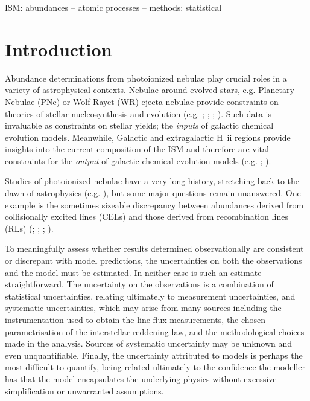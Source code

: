 \documentclass[useAMS,usenatbib]{mn2e}
\begin{document}
\begin{keywords}
ISM: abundances -- atomic processes -- methods: statistical
\end{keywords}

\section{Introduction}

Abundance determinations from photoionized nebulae play crucial roles in a variety of astrophysical contexts. Nebulae around evolved stars, e.g. Planetary Nebulae (PNe) or Wolf-Rayet (WR) ejecta nebulae provide constraints on theories of stellar nucleosynthesis and evolution (e.g. \citealt{2009ApJ...690.1130K};  \citealt{2011arXiv1110.1186M}; \citealt{1992A&A...264..105M}; \citealt{2011MNRAS.418.2532S}). Such data is invaluable as constraints on stellar yields; the \textit{inputs} of galactic chemical evolution models. Meanwhile, Galactic and extragalactic H~{\sc ii} regions provide insights into the current composition of the ISM and therefore are vital constraints for the \textit{output} of galactic chemical evolution models (e.g. \citealt{1997nceg.book.....P}; \citealt{2003ceg..book.....M}).

Studies of photoionized nebulae have a very long history, stretching back to the dawn of astrophysics (e.g. \citealt{1864RSPT..154..437H}), but some major questions remain unanswered.  One example is the sometimes sizeable discrepancy between abundances derived from collisionally excited lines (CELs) and those derived from recombination lines (RLs) (\citealt{2005MNRAS.362..424W}; \citealt{2006MNRAS.368.1959L}; \citealt{2007ApJ...670..457G}; \citealt{2008MNRAS.386...22T}).

To meaningfully assess whether results determined observationally are consistent or discrepant with model predictions, the uncertainties on both the observations and the model must be estimated.  In neither case is such an estimate straightforward.  The uncertainty on the observations is a combination of statistical uncertainties, relating ultimately to measurement uncertainties, and systematic uncertainties, which may arise from many sources including the instrumentation used to obtain the line flux measurements, the chosen parametrisation of the interstellar reddening law, and the methodological choices made in the analysis.  Sources of systematic uncertainty may be unknown and even unquantifiable.  Finally, the uncertainty attributed to models is perhaps the most difficult to quantify, being related ultimately to the confidence the modeller has that the model encapsulates the underlying physics without excessive simplification or unwarranted assumptions.
\end{document}
